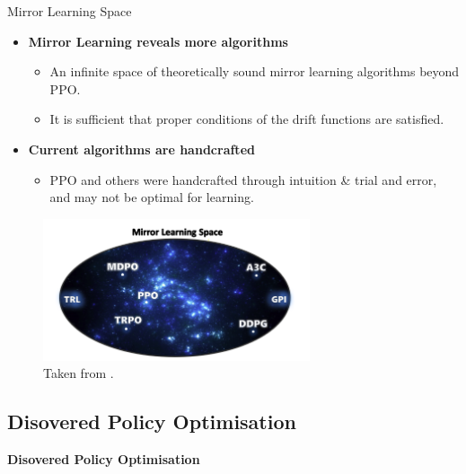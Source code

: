 \documentclass[9pt]{beamer}
\begin{document}
\begin{frame}{Mirror Learning Space}
  \begin{flushleft} %
    \begin{itemize}

      \item \textbf{Mirror Learning reveals more algorithms}
                \hfill
        \begin{itemize}
          \item An infinite space of theoretically sound mirror learning algorithms beyond PPO.
        \end{itemize}
        \begin{itemize}
          \item It is sufficient that proper conditions of the drift functions are satisfied.
        \end{itemize}

          \hfill
      \item \textbf{Current algorithms are handcrafted}
                \hfill
        \begin{itemize}
          \item PPO and others were handcrafted through intuition \& trial and error, and may not be optimal for learning.
        \end{itemize}
    
    \end{itemize}
  \end{flushleft}

  \hfill
  \begin{figure}

    \centering
    \includegraphics[width=0.7\textwidth]{figures/mirror_space.png}  %
    \caption{Taken from \cite{mirror2022}.}

  \end{figure}
\end{frame}



\begin{frame}[plain]
  \section{Disovered Policy Optimisation}
  \vfill
  \begin{center}
    \Huge \textbf{Disovered Policy Optimisation}
  \end{center}
  \vfill
\end{frame}
\end{document}
